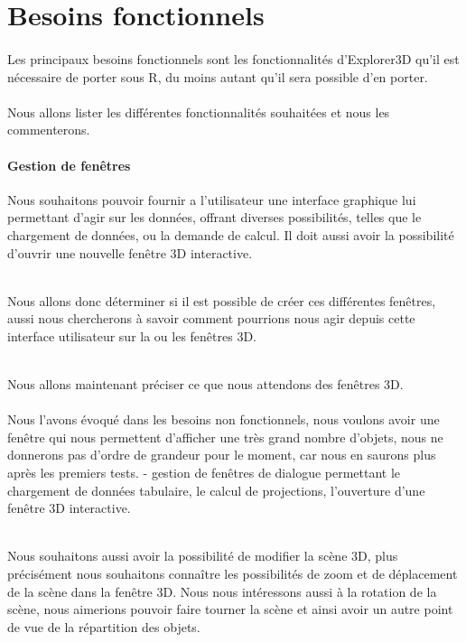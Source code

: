\section{Besoins fonctionnels}
\paragraph{} Les principaux besoins fonctionnels sont les fonctionnalités d'Explorer3D qu'il est nécessaire de porter sous R, du moins autant qu'il sera possible d'en porter.\\\\
\indent Nous allons lister les différentes fonctionnalités souhaitées et nous les commenterons.

\paragraph{Gestion de fenêtres} Nous souhaitons pouvoir fournir a l'utilisateur une interface graphique lui permettant d'agir sur les données, offrant diverses possibilités, telles que le chargement de données, ou la demande de calcul. Il doit aussi avoir la possibilité d'ouvrir une nouvelle fenêtre 3D interactive.\\\\\indent

 Nous allons donc déterminer si il est possible de créer ces différentes fenêtres, aussi nous chercherons à savoir comment pourrions nous agir depuis cette interface utilisateur sur la ou les fenêtres 3D.\\\\\indent 
 
 Nous allons maintenant préciser ce que nous attendons des fenêtres 3D.\\\\\indent Nous l'avons évoqué dans les besoins non fonctionnels, nous voulons avoir une fenêtre qui nous permettent d'afficher une très grand nombre d'objets, nous ne donnerons pas d'ordre de grandeur pour le moment, car nous en saurons plus après les premiers tests.
- gestion de fenêtres de dialogue permettant le chargement de données tabulaire, le calcul de projections, l'ouverture d'une fenêtre 3D interactive.\\\\\indent

Nous souhaitons aussi avoir la possibilité de modifier la scène 3D, plus précisément nous souhaitons connaître les possibilités de zoom et de déplacement de la scène dans la fenêtre 3D. Nous nous intéressons aussi à la rotation de la scène, nous aimerions pouvoir faire tourner la scène et ainsi avoir un autre point de vue de la répartition des objets.\\\\\indent

